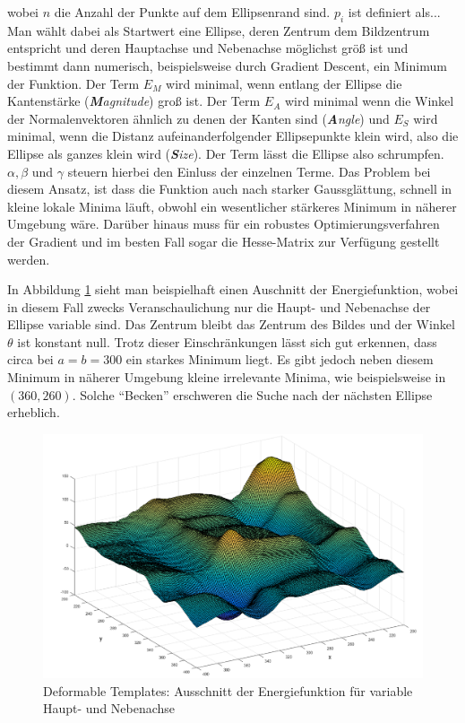 wobei $n$ die Anzahl der Punkte auf dem Ellipsenrand sind. $p_i$ ist definiert als...
Man wählt dabei als Startwert eine Ellipse, deren Zentrum dem Bildzentrum entspricht und deren Hauptachse und Nebenachse möglichst größ ist und bestimmt dann numerisch, beispielsweise durch Gradient Descent, ein Minimum der Funktion. Der Term $E_M$ wird minimal, wenn entlang der Ellipse die Kantenstärke (\textit{\textbf{M}agnitude}) groß ist. Der Term $E_A$ wird minimal wenn die Winkel der Normalenvektoren ähnlich zu denen der Kanten sind (\textit{\textbf{A}ngle}) und $E_S$ wird minimal, wenn die Distanz aufeinanderfolgender Ellipsepunkte klein wird, also die Ellipse als ganzes klein wird (\textit{\textbf{S}ize}). Der Term lässt die Ellipse also schrumpfen. $\alpha, \beta$ und $\gamma$ steuern hierbei den Einluss der einzelnen Terme. Das Problem bei diesem Ansatz, ist dass die Funktion auch nach starker Gaussglättung, schnell in kleine lokale Minima läuft, obwohl ein wesentlicher stärkeres Minimum in näherer Umgebung wäre. Darüber hinaus muss für ein robustes Optimierungsverfahren der Gradient und im besten Fall sogar die Hesse-Matrix zur Verfügung gestellt werden. 

In Abbildung \ref{fig:deformable} sieht man beispielhaft einen Auschnitt der Energiefunktion, wobei in diesem Fall zwecks Veranschaulichung nur die Haupt- und Nebenachse der Ellipse variable sind. Das Zentrum bleibt das Zentrum des Bildes und der Winkel $\theta$ ist konstant null. Trotz dieser Einschränkungen lässt sich gut erkennen, dass circa bei $a = b = 300$ ein starkes Minimum liegt. Es gibt jedoch neben diesem Minimum in näherer Umgebung kleine irrelevante Minima, wie beispielsweise in $(360, 260)$. Solche "`Becken"' erschweren die Suche nach der nächsten Ellipse erheblich.


\begin{figure}[!htb]
	\centering
	\includegraphics[scale=.4]{images/deformable.png}
	\caption{Deformable Templates: Ausschnitt der Energiefunktion für variable Haupt- und Nebenachse}
	\label{fig:deformable}
\end{figure}













